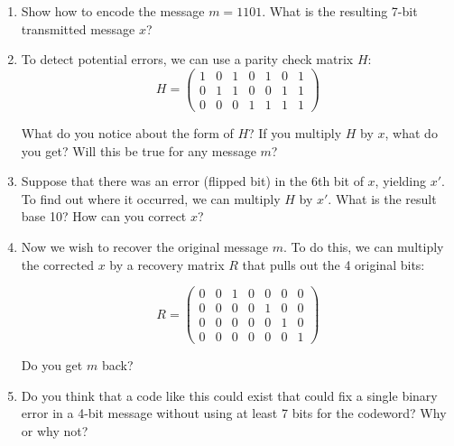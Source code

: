 \documentclass[11pt]{article}
\newif\ifsolutions
\begin{document}
\begin{enumerate}
\begin{enumerate}

\item Show how to encode the message $m=1101$.  What is the resulting 7-bit transmitted message $x$?
\vspace{15mm}

\ifsolutions 
\vspace{-15mm}
{\color{blue}{
\textbf{Solutions:} $Gm = x = 1010101$.
}}
\fi

\item To detect potential errors, we can use a parity check matrix $H$:
\[ H = \left( \begin{array}{ccccccc} 1 & 0 & 1 & 0 & 1 & 0 & 1 \\
0 & 1 & 1 & 0 & 0 & 1 & 1 \\
0 & 0 & 0 & 1 & 1 & 1 & 1
\end{array} \right)
\]

What do you notice about the form of $H$?  If you multiply $H$ by $x$, what do you get? Will this be true for any message $m$?
\vspace{15mm}

\item Suppose that there was an error (flipped bit) in the 6th bit of $x$, yielding $x'$. To find out where it occurred, we can multiply $H$ by $x'$. What is the result base 10? How can you correct $x$?
\vspace{15mm}

\ifsolutions 
\vspace{-15mm}
{\color{blue}{
\textbf{Solutions:} We actually received $x' = 1010111$. Computing $Hx'$, we get the sixth column of $H$, which corresponds to 6 in binary, so we know the 6th bit should be flipped to correct $x$.
}}
\fi

\item Now we wish to recover the original message $m$. To do this, we can multiply the corrected $x$ by a recovery matrix $R$ that pulls out the 4 original bits:

\[ R = \left( \begin{array}{ccccccc} 0 & 0 & 1 & 0 & 0 & 0 & 0 \\
0 & 0 & 0 & 0 & 1 & 0 & 0 \\
0 & 0 & 0 & 0 & 0 & 1 & 0 \\
0 & 0 & 0 & 0 & 0 & 0 & 1
\end{array} \right)
\]   

Do you get $m$ back?

\vspace{15mm}

\ifsolutions 
{\color{blue}{
\textbf{Solutions:} After correcting $x$, we compute $Rx = m$, and get back $m=1101$.
}}
\fi

\item Do you think that a code like this could exist that could fix a single binary error in a 4-bit message without using at least 7 bits for the codeword? Why or why not?

\end{enumerate}
 \end{enumerate}
\end{document}

